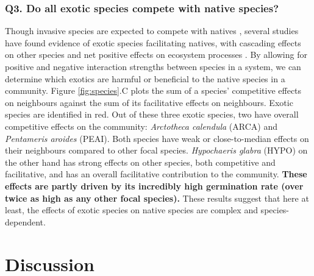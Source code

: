 \documentclass[a4,12pt]{article}
\begin{document}
\begin{refsection}
    \subsubsection*{Q3. Do all exotic species compete with native species?}
    Though invasive species are expected to compete with natives \parencite{Naeem2000, Corbin2004, Riley2008, Zheng2015}, several studies have found evidence of exotic species facilitating natives, with cascading effects on other species and net positive effects on ecosystem processes \parencite{Rodriguez2006, Ramus2017, Wainwright2019}. By allowing for positive and negative interaction strengths between species in a system, we can determine which exotics are harmful or beneficial to the native species in a community. Figure \ref{fig:species}.C plots the sum of a species' competitive effects on neighbours against the sum of its facilitative effects on neighbours. Exotic species are identified in red. Out of these three exotic species, two have overall competitive effects on the community: \textit{Arctotheca calendula} (ARCA) and \textit{Pentameris aroides} (PEAI). Both species have weak or close-to-median effects on their neighbours compared to other focal species. %
    \textit{Hypochaeris glabra} (HYPO) on the other hand has strong effects on other species, both competitive and facilitative, and has an overall facilitative contribution to the community. \textbf{These effects are partly driven by its incredibly high germination rate (over twice as high as any other focal species).}  These results suggest that here at least, the effects of exotic species on native species are complex and species-dependent.


\section{Discussion}



\end{refsection}
\end{document}
